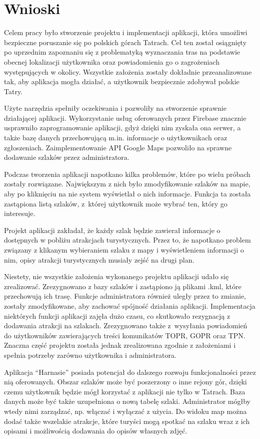 \section{Wnioski} \label{wnioski}
Celem pracy było stworzenie projektu i implementacji aplikacji, która umożliwi bezpieczne poruszanie się po polskich górach Tatrach. Cel ten został osiągnięty po uprzednim zapoznaniu się z problematyką wyznaczania tras na podstawie obecnej lokalizacji użytkownika oraz powiadomienia go o zagrożeniach występujących w okolicy. Wszystkie założenia zostały dokładnie przeanalizowane tak, aby aplikacja mogła działać, a użytkownik bezpiecznie zdobywał polskie Tatry.

Użyte narzędzia spełniły oczekiwania i pozwoliły na stworzenie sprawnie działającej aplikacji. Wykorzystanie usług oferowanych przez Firebase znacznie usprawniło zaprogramowanie aplikacji, gdyż dzięki nim zyskała ona serwer, a także bazę danych przechowującą m.in. informacje o użytkownikach oraz zgłoszeniach. Zaimplementowanie API Google Maps pozwoliło na sprawne dodawanie szlaków przez administratora.

Podczas tworzenia aplikacji napotkano kilka problemów, które po wielu próbach zostały rozwiązane. Największym z nich było zmodyfikowanie szlaków na mapie, aby po kliknięciu na nie system wyświetlał o nich informacje. Funkcja ta została zastąpiona listą szlaków, z~której użytkownik może wybrać ten, który go interesuje.

Projekt aplikacji zakładał, że każdy szlak będzie zawierał informacje o dostępnych w pobliżu atrakcjach turystycznych. Przez to, że napotkano problem związany z klikanym wybieraniem szlaku z mapy i wyświetleniem informacji o nim, opisy atrakcji turystycznych musiały zejść na drugi plan.

Niestety, nie wszystkie założenia wykonanego projektu aplikacji udało się zrealizować. Zrezygnowano z bazy szlaków i zastąpiono ją plikami .kml, które przechowują ich trasę. Funkcje administratora również uległy przez to zmianie, zostały zmodyfikowane, aby zachować spójność działania aplikacji. Implementacja niektórych funkcji aplikacji zajęła dużo czasu, co skutkowało rezygnacją z dodawania atrakcji na szlakach. Zrezygnowano także z~wysyłania powiadomień do użytkowników zawierających treści komunikatów TOPR, GOPR oraz TPN. Znaczna część projektu została jednak zrealizowana zgodnie z założeniami i spełnia potrzeby zarówno użytkownika i administratora.

Aplikacja “Harnasie” posiada potencjał do dalszego rozwoju funkcjonalności przez nią oferowanych. Obszar szlaków może być poszerzony o inne rejony gór, dzięki czemu użytkownik będzie mógł korzystać z aplikacji nie tylko w Tatrach. Baza danych może być także uzupełniona o nową tabelę szlaki. Administrator mógłby wtedy nimi zarządzać, np. włączać i wyłączać z użycia. Do widoku map można dodać także wszelakie atrakcje, które turyści mogą spotkać na szlaku wraz z ich opisami i możliwością dodawania do opisów własnych zdjęć.

